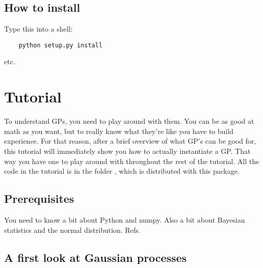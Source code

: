 \documentclass{manual}
\begin{document}
\section{How to install}\label{sec:installing}

Type this into a shell:
\begin{verbatim}
	python setup.py install
\end{verbatim}
etc.




\chapter{Tutorial}\label{cha:tutorial} 

To understand GPs, you need to play around with them. You can be as good at math as you want, but to really know what they're like you have to build experience. For that reason, after a brief overview of what GP's can be good for, this tutorial will immediately show you how to actually instantiate a GP. That way you have one to play around with throughout the rest of the tutorial. All the code in the tutorial is in the folder , which is distributed with this package.

\section{Prerequisites}\label{sec:prerequisites}
You need to know a bit about Python and numpy. Also a bit about Bayesian statistics and the normal distribution. Refs. 

\section{A first look at Gaussian processes}\label{sec:firstlook} %
\end{document}
